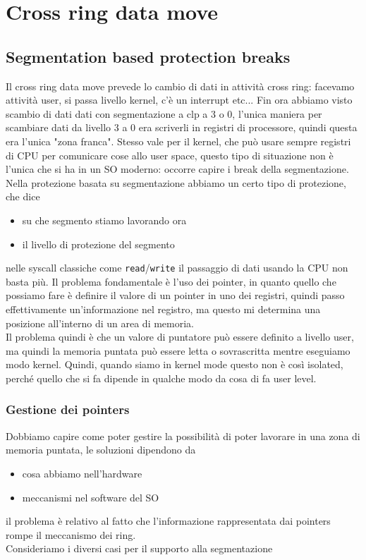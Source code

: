 \documentclass[12pt, oneside]{extbook}
\begin{document}
\chapter{Cross ring data move}
\section{Segmentation based protection breaks}
Il cross ring data move prevede lo cambio di dati in attività cross ring: facevamo attività user, si passa livello kernel, c'è un interrupt etc... Fin ora abbiamo visto scambio di dati dati con segmentazione a clp a 3 o 0, l'unica maniera per scambiare dati da livello 3 a 0 era scriverli in registri di processore, quindi questa era l'unica "zona franca". Stesso vale per il kernel, che può usare sempre registri di CPU per comunicare cose allo user space, questo tipo di situazione non è l'unica che si ha in un SO moderno: occorre capire i break della segmentazione. Nella protezione basata su segmentazione abbiamo un certo tipo di protezione, che dice 
\begin{itemize}
\item su che segmento stiamo lavorando ora 
\item il livello di protezione del segmento
\end{itemize}
nelle syscall classiche come \texttt{read}/\texttt{write} il passaggio di dati usando la CPU non basta più. Il problema fondamentale è l'uso dei pointer, in quanto quello che possiamo fare è definire il valore di un pointer in uno dei registri, quindi passo effettivamente un'informazione nel registro, ma questo mi determina una posizione all'interno di un area di memoria.\\Il problema quindi è che un valore di puntatore può essere definito a livello user, ma quindi la memoria puntata può essere letta o sovrascritta mentre eseguiamo modo kernel. Quindi, quando siamo in kernel mode questo non è così isolated, perché quello che si fa dipende in qualche modo da cosa di fa user level.
\subsection{Gestione dei pointers}
Dobbiamo capire come poter gestire la possibilità di poter lavorare in una zona di memoria puntata, le soluzioni dipendono da 
\begin{itemize}
\item cosa abbiamo nell'hardware
\item meccanismi nel software del SO
\end{itemize}
il problema è relativo al fatto che l'informazione rappresentata dai pointers rompe il meccanismo dei ring.\\Consideriamo i diversi casi per il supporto alla segmentazione
\end{document}
